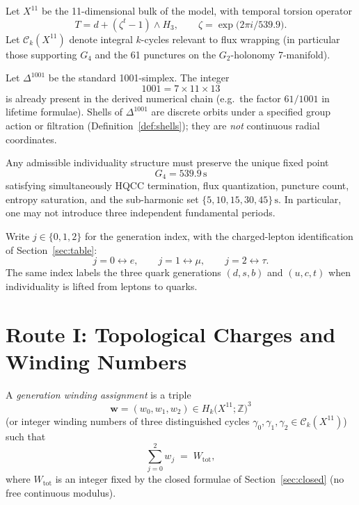 \begin{definition}
\label{def:11D}
Let \(X^{11}\) be the 11-dimensional bulk of the model, with temporal torsion
operator
\[
T=d+(\zeta^t-1)\wedge H_3,\qquad
\zeta=\exp\bigl(2\pi i/539.9\bigr).
\]
Let \(\mathcal{C}_k(X^{11})\) denote integral \(k\)-cycles relevant to flux
wrapping (in particular those supporting \(G_4\) and the 61 punctures on the
\(G_2\)-holonomy 7-manifold).
\end{definition}

\begin{definition}[1001-Simplex]
\label{def:1001}
Let \(\Delta^{1001}\) be the standard 1001-simplex. The integer
\[
1001=7\times 11\times 13
\]
is already present in the derived numerical chain (e.g.\ the factor \(61/1001\)
in lifetime formulae). Shells of \(\Delta^{1001}\) are discrete orbits under a
specified group action or filtration (Definition~\ref{def:shells}); they are
\emph{not} continuous radial coordinates.
\end{definition}

\begin{lemma}
\label{lem:rigidity}
Any admissible individuality structure must preserve the unique fixed point
\[
G_4=539.9\,\mathrm{s}
\]
satisfying simultaneously HQCC termination, flux quantization, puncture count,
entropy saturation, and the sub-harmonic set \(\{5,10,15,30,45\}\,\mathrm{s}\).
In particular, one may not introduce three independent fundamental periods.
\end{lemma}

\begin{definition}
\label{def:index}
Write \(j\in\{0,1,2\}\) for the generation index, with the charged-lepton
identification of Section~\ref{sec:table}:
\[
j=0\leftrightarrow e,\qquad
j=1\leftrightarrow \mu,\qquad
j=2\leftrightarrow \tau.
\]
The same index labels the three quark generations \((d,s,b)\) and \((u,c,t)\)
when individuality is lifted from leptons to quarks.
\end{definition}

\section{Route I: Topological Charges and Winding Numbers}
\label{sec:route1}

\begin{definition}
\label{def:windings}
A \emph{generation winding assignment} is a triple
\[
\mathbf{w}=(w_0,w_1,w_2)\in H_k\bigl(X^{11};\mathbb{Z}\bigr)^3
\]
(or integer winding numbers of three distinguished cycles
\(\gamma_0,\gamma_1,\gamma_2\in\mathcal{C}_k(X^{11})\)) such that
\begin{equation}
\label{eq:winding-sum}
\sum_{j=0}^{2} w_j \;=\; W_{\mathrm{tot}},
\end{equation}
where \(W_{\mathrm{tot}}\) is an integer fixed by the closed formulae of
Section~\ref{sec:closed} (no free continuous modulus).
\end{definition}

